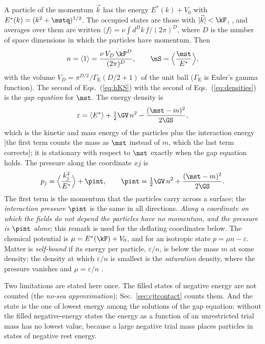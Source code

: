 A particle of the momentum $\vec k$ has the energy $E^{*}(k)+V_0$ with
$E^{*}(k)=(k^{2}+\mstq)^{1/2}$. The occupied states are those with $|\vec k|<\kF$, , and averages over them are written
$\langle f\rangle=\nu\int d^{D}k\,f/(2\pi)^{D}$, where $D$ is the number of space dimensions in which
the particles have momentum. Then
\begin{equation}
n=\langle1\rangle=\frac{\nu\,V_D\,\kF^{D}}{(2\pi)^{D}},\qquad\nS=\Big\langle\frac{\mst}{E^{*}}\Big\rangle,
\label{eq:densities}
\end{equation}
with the volume $V_D=\pi^{D/2}/\Gamma_{\mathrm E}(D/2+1)$ of the unit ball ($\Gamma_{\mathrm E}$ is
Euler's gamma function). The second of Eqs.~(\ref{eq:hKS}) with the second of
Eqs.~(\ref{eq:densities}) is the \emph{gap equation} for $\mst$. The energy density is
\begin{equation}
\varepsilon=\langle E^{*}\rangle+\tfrac12\GV\,n^{2}-\frac{(\mst-m)^{2}}{2\GS},
\label{eq:epsKS}
\end{equation}
which is the kinetic and mass energy of the particles plus the interaction energy [the first term
counts the mass as $\mst$ instead of $m$, which the last term corrects]; it is stationary with
respect to $\mst$ exactly when the gap equation holds. The pressure along the coordinate $xj$ is
\begin{equation}
p_j=\Big\langle\frac{k_j^{2}}{E^{*}}\Big\rangle+\pint,\qquad\pint=\tfrac12\GV\,n^{2}+\frac{(\mst-m)^{2}}{2\GS}.
\label{eq:pKS}
\end{equation}
The first term is the momentum that the particles carry across a surface; the \emph{interaction
pressure} $\pint$ is the same in all directions. \emph{Along a coordinate on which the fields do not
depend the particles have no momentum, and the pressure is $\pint$ alone}; this remark is used for
the deflating coordinates below. The chemical potential is $\mu=E^{*}(\kF)+V_0$, and for an
isotropic state $p=\mu n-\varepsilon$. Matter is \emph{self-bound} if its energy per particle,
$\varepsilon/n$, is below the mass $m$ at some density; the density at which $\varepsilon/n$ is
smallest is the \emph{saturation} density, where the pressure vanishes and
$\mu=\varepsilon/n$ \cite{HugenholtzVanHove1958}.

Two limitations are stated here once. The filled states of negative energy are not counted (the
\emph{no-sea approximation}); Sec.~\ref{sec:cjtcontact} counts them. And the state is the one of
lowest energy among the solutions of the gap equation: without the filled negative-energy states the
energy as a function of an unrestricted trial mass has no lowest value, because a large negative
trial mass places particles in states of negative rest energy.

